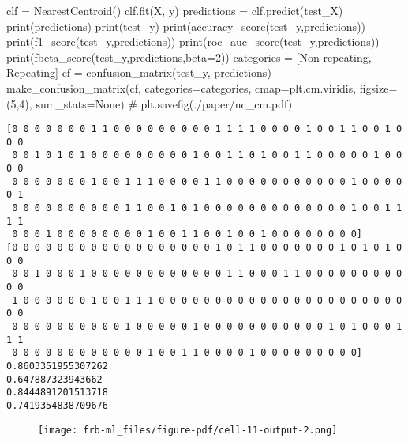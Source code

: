\documentclass[
  letterpaper,
  DIV=11,
  numbers=noendperiod]{scrartcl}
\newenvironment{Shaded}{\begin{snugshade}}{\end{snugshade}}
\newcommand{\BuiltInTok}[1]{\textcolor[rgb]{0.00,0.23,0.31}{#1}}
\newcommand{\CommentTok}[1]{\textcolor[rgb]{0.37,0.37,0.37}{#1}}
\newcommand{\DecValTok}[1]{\textcolor[rgb]{0.68,0.00,0.00}{#1}}
\newcommand{\NormalTok}[1]{\textcolor[rgb]{0.00,0.23,0.31}{#1}}
\newcommand{\OperatorTok}[1]{\textcolor[rgb]{0.37,0.37,0.37}{#1}}
\newcommand{\StringTok}[1]{\textcolor[rgb]{0.13,0.47,0.30}{#1}}
\newcommand{\VariableTok}[1]{\textcolor[rgb]{0.07,0.07,0.07}{#1}}
\begin{document}
\begin{Shaded}
\begin{Highlighting}[]
\NormalTok{clf }\OperatorTok{=}\NormalTok{ NearestCentroid()}
\NormalTok{clf.fit(X, y)}
\NormalTok{predictions }\OperatorTok{=}\NormalTok{ clf.predict(test\_X)}
\BuiltInTok{print}\NormalTok{(predictions)}
\BuiltInTok{print}\NormalTok{(test\_y)}
\BuiltInTok{print}\NormalTok{(accuracy\_score(test\_y,predictions))}
\BuiltInTok{print}\NormalTok{(f1\_score(test\_y,predictions))}
\BuiltInTok{print}\NormalTok{(roc\_auc\_score(test\_y,predictions))}
\BuiltInTok{print}\NormalTok{(fbeta\_score(test\_y,predictions,beta}\OperatorTok{=}\DecValTok{2}\NormalTok{))}
\NormalTok{categories }\OperatorTok{=}\NormalTok{ [}\StringTok{\textquotesingle{}Non{-}repeating\textquotesingle{}}\NormalTok{, }\StringTok{\textquotesingle{}Repeating\textquotesingle{}}\NormalTok{]}
\NormalTok{cf }\OperatorTok{=}\NormalTok{ confusion\_matrix(test\_y, predictions)}
\NormalTok{make\_confusion\_matrix(cf, }
\NormalTok{                      categories}\OperatorTok{=}\NormalTok{categories,}
\NormalTok{                      cmap}\OperatorTok{=}\NormalTok{plt.cm.viridis,}
\NormalTok{                      figsize}\OperatorTok{=}\NormalTok{(}\DecValTok{5}\NormalTok{,}\DecValTok{4}\NormalTok{),}
\NormalTok{                      sum\_stats}\OperatorTok{=}\VariableTok{None}\NormalTok{)}
\CommentTok{\# plt.savefig(\textquotesingle{}./paper/nc\_cm.pdf\textquotesingle{})}
\end{Highlighting}
\end{Shaded}

\begin{verbatim}
[0 0 0 0 0 0 0 1 1 0 0 0 0 0 0 0 0 0 1 1 1 1 0 0 0 0 1 0 0 1 1 0 0 1 0 0 0
 0 0 1 0 1 0 1 0 0 0 0 0 0 0 0 0 1 0 0 1 1 0 1 0 0 1 1 0 0 0 0 0 1 0 0 0 0
 0 0 0 0 0 0 0 1 0 0 1 1 1 0 0 0 0 1 1 0 0 0 0 0 0 0 0 0 0 0 1 0 0 0 0 0 1
 0 0 0 0 0 0 0 0 0 0 1 1 0 0 1 0 1 0 0 0 0 0 0 0 0 0 0 0 0 0 1 0 0 1 1 1 1
 0 0 0 1 0 0 0 0 0 0 0 0 1 0 0 1 1 0 0 1 0 0 1 0 0 0 0 0 0 0 0]
[0 0 0 0 0 0 0 0 0 0 0 0 0 0 0 0 0 0 1 0 1 1 0 0 0 0 0 0 0 1 0 1 0 1 0 0 0
 0 0 1 0 0 0 1 0 0 0 0 0 0 0 0 0 0 0 0 1 1 0 0 0 1 1 0 0 0 0 0 0 0 0 0 0 0
 1 0 0 0 0 0 0 1 0 0 1 1 1 0 0 0 0 0 0 0 0 0 0 0 0 0 0 0 0 0 0 0 0 0 0 0 0
 0 0 0 0 0 0 0 0 0 0 1 0 0 0 0 0 1 0 0 0 0 0 0 0 0 0 0 0 1 0 1 0 0 0 1 1 1
 0 0 0 0 0 0 0 0 0 0 0 0 1 0 0 1 1 0 0 0 0 1 0 0 0 0 0 0 0 0 0]
0.8603351955307262
0.647887323943662
0.8444891201513718
0.7419354838709676
\end{verbatim}

\begin{figure}[H]

{\centering \texttt{[image: frb-ml\_files/figure-pdf/cell-11-output-2.png]}

}

\end{figure}
\end{document}

